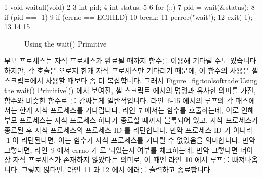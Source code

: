 { \scriptsize
\begin{verbbox}
  1 void waitall(void)
  2 {
  3   int pid;
  4   int status;
  5 
  6   for (;;) {
  7     pid = wait(&status);
  8     if (pid == -1) {
  9       if (errno == ECHILD)
 10         break;
 11       perror("wait");
 12       exit(-1);
 13     }
 14   }
 15 }
\end{verbbox}
}
\begin{figure}[tbp]
\centering
\theverbbox
\caption{Using the wait() Primitive}
\label{fig:toolsoftrade:Using the wait() Primitive}
\end{figure}

부모 프로세스는 자식 프로세스가 완료될 때까지  함수를 이용해 기다릴
수도 있습니다.
하지만, 각  호출은 오로지 한개 자식 프로세스만 기다리기 때문에, 이
함수의 사용은 셸 스크립트에서 사용할 때보다 좀 더 복잡합니다.
그래서 Figure~\ref{fig:toolsoftrade:Using the wait()
Primitive}() 에서 보여진, 셸 스크립트 에서의  명령과
유사한 의미를 가진,  함수와 비슷한 함수로  를 감싸는게
일반적입니다.
라인~6-15 에서의 루프의 각 패스에서는 한개 자식 프로세스를 기다립니다.
라인~7 에서는  함수를 호출하는데, 이로 인해 부모 프로세스는 자식
프로세스 하나가 종료할 때까지 블록되어 있고, 자식 프로세스가 종료된 후 자식
프로세스의 프로세스 ID 를 리턴합니다.
만약 프로세스 ID 가 아니라 -1 이 리턴된다면, 이는  함수가 자식
프로세스를 기다릴 수 없었음을 의미합니다.
만약 그렇다면, 라인~9 에서 errno 가  로 되었는지 여부를 체크하는데,
만약 그렇다면 더이상 자식 프로세스가 존재하지 않았다는 의미로, 이 때엔 라인~10
에서 루프를 빠져나옵니다.
그렇지 않다면, 라인~11 과 12 에서 에러를 출력하고 종료합니다.

